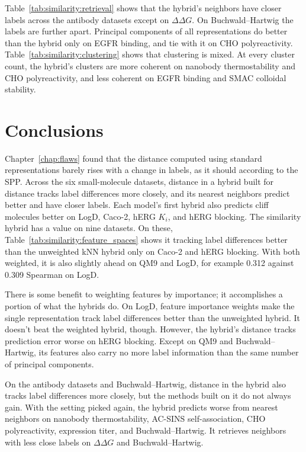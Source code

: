 Table~\ref{tab:similarity:retrieval} shows that the hybrid's neighbors have closer labels across the antibody datasets except on $\Delta\Delta G$. On Buchwald--Hartwig the labels are further apart. Principal components of all representations do better than the hybrid only on EGFR binding, and tie with it on CHO polyreactivity. Table~\ref{tab:similarity:clustering} shows that clustering is mixed. At every cluster count, the hybrid's clusters are more coherent on nanobody thermostability and CHO polyreactivity, and less coherent on EGFR binding and SMAC colloidal stability.

\section{Conclusions}\label{sec:similarity:conclusions}

Chapter~\ref{chap:flaws} found that the distance computed using standard representations barely rises with a change in labels, as it should according to the SPP. Across the six small-molecule datasets, distance in a hybrid built for distance tracks label differences more closely, and its nearest neighbors predict better and have closer labels. Each model's first hybrid also predicts cliff molecules better on LogD, Caco-2, hERG $K_i$, and hERG blocking. The similarity hybrid has a value on nine datasets. On these, Table~\ref{tab:similarity:feature_spaces} shows it tracking label differences better than the unweighted kNN hybrid only on Caco-2 and hERG blocking. With both weighted, it is also slightly ahead on QM9 and LogD, for example 0.312 against 0.309 Spearman on LogD.

There is some benefit to weighting features by importance; it accomplishes a portion of what the hybrids do. On LogD, feature importance weights make the single representation track label differences better than the unweighted hybrid. It doesn't beat the weighted hybrid, though. However, the hybrid's distance tracks prediction error worse on hERG blocking. Except on QM9 and Buchwald--Hartwig, its features also carry no more label information than the same number of principal components.

On the antibody datasets and Buchwald--Hartwig, distance in the hybrid also tracks label differences more closely, but the methods built on it do not always gain. With the setting picked again, the hybrid predicts worse from nearest neighbors on nanobody thermostability, AC-SINS self-association, CHO polyreactivity, expression titer, and Buchwald--Hartwig. It retrieves neighbors with less close labels on $\Delta\Delta G$ and Buchwald--Hartwig.



